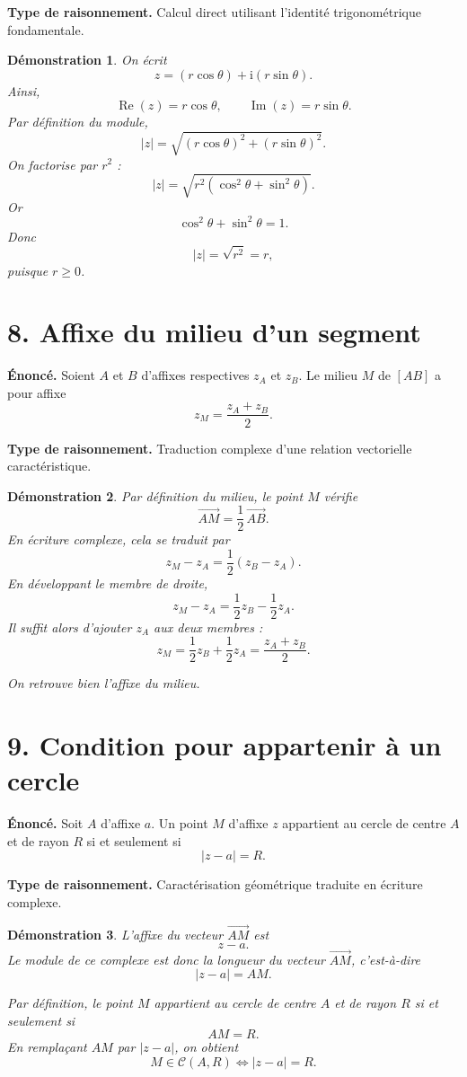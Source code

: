 \documentclass[11pt,a4paper]{article}
\newtheorem{prop}{Démonstration}
\newcommand{\ii}{\mathrm{i}}
\newcommand{\Reel}{\operatorname{Re}}
\newcommand{\Imag}{\operatorname{Im}}
\begin{document}
\textbf{Type de raisonnement.} Calcul direct utilisant l'identité trigonométrique fondamentale.

\begin{prop}
On écrit
\[
z=(r\cos\theta)+\ii(r\sin\theta).
\]
Ainsi,
\[
\Reel(z)=r\cos\theta,
\qquad
\Imag(z)=r\sin\theta.
\]
Par définition du module,
\[
|z|=\sqrt{(r\cos\theta)^2+(r\sin\theta)^2}.
\]
On factorise par $r^2$ :
\[
|z|=\sqrt{r^2(\cos^2\theta+\sin^2\theta)}.
\]
Or
\[
\cos^2\theta+\sin^2\theta=1.
\]
Donc
\[
|z|=\sqrt{r^2}=r,
\]
puisque $r\geq 0$.
\end{prop}

\section*{8. Affixe du milieu d'un segment}

\textbf{Énoncé.} Soient $A$ et $B$ d'affixes respectives $z_A$ et $z_B$. Le milieu $M$ de $[AB]$ a pour affixe
\[
z_M=\frac{z_A+z_B}{2}.
\]

\textbf{Type de raisonnement.} Traduction complexe d'une relation vectorielle caractéristique.

\begin{prop}
Par définition du milieu, le point $M$ vérifie
\[
\overrightarrow{AM}=\frac12\,\overrightarrow{AB}.
\]
En écriture complexe, cela se traduit par
\[
z_M-z_A=\frac12(z_B-z_A).
\]
En développant le membre de droite,
\[
z_M-z_A=\frac12 z_B-\frac12 z_A.
\]
Il suffit alors d'ajouter $z_A$ aux deux membres :
\[
z_M=\frac12 z_B+\frac12 z_A=\frac{z_A+z_B}{2}.
\]

On retrouve bien l'affixe du milieu.
\end{prop}

\section*{9. Condition pour appartenir à un cercle}

\textbf{Énoncé.} Soit $A$ d'affixe $a$. Un point $M$ d'affixe $z$ appartient au cercle de centre $A$ et de rayon $R$ si et seulement si
\[
|z-a|=R.
\]

\textbf{Type de raisonnement.} Caractérisation géométrique traduite en écriture complexe.

\begin{prop}
L'affixe du vecteur $\overrightarrow{AM}$ est
\[
z-a.
\]
Le module de ce complexe est donc la longueur du vecteur $\overrightarrow{AM}$, c'est-à-dire
\[
|z-a|=AM.
\]

Par définition, le point $M$ appartient au cercle de centre $A$ et de rayon $R$ si et seulement si
\[
AM=R.
\]
En remplaçant $AM$ par $|z-a|$, on obtient
\[
M\in \mathcal{C}(A,R)\iff |z-a|=R.
\]
\end{prop}
\end{document}
